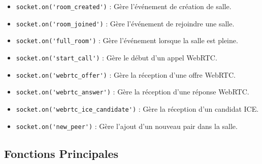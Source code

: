 \documentclass[12pt, a4paper, oneside]{Thesis}
\begin{document}
\begin{itemize}
  \item \verb|socket.on('room_created')| : Gère l'événement de création de salle.
  \item \verb|socket.on('room_joined')| : Gère l'événement de rejoindre une salle.
  \item \verb|socket.on('full_room')| : Gère l'événement lorsque la salle est pleine.
  \item \verb|socket.on('start_call')| : Gère le début d'un appel WebRTC.
  \item \verb|socket.on('webrtc_offer')| : Gère la réception d'une offre WebRTC.
  \item \verb|socket.on('webrtc_answer')| : Gère la réception d'une réponse WebRTC.
  \item \verb|socket.on('webrtc_ice_candidate')| : Gère la réception d'un candidat ICE.
  \item \verb|socket.on('new_peer')| : Gère l'ajout d'un nouveau pair dans la salle.
\end{itemize}

\newpage

\subsection{Fonctions Principales}
\end{document}
